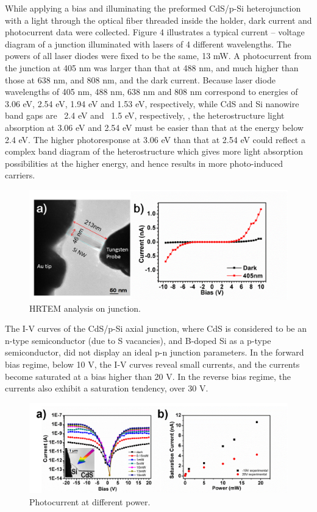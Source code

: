 While applying a bias and illuminating the preformed CdS/p-Si heterojunction with a light through the optical fiber threaded inside the holder, dark current and photocurrent data were collected. Figure 4 illustrates a typical current – voltage diagram of a junction illuminated with lasers of 4 different wavelengths. The powers of all laser diodes were fixed to be the same, 13 mW. A photocurrent from the junction at 405 nm was larger than that at 488 nm, and much higher than those at 638 nm, and 808 nm, and the dark current. Because laser diode wavelengths of 405 nm, 488 nm, 638 nm and 808 nm correspond to energies of 3.06 eV, 2.54 eV, 1.94 eV and 1.53 eV, respectively, while CdS and Si nanowire band gaps are ~2.4 eV and ~1.5 eV, respectively, \cite{Fabbri2014}, the heterostructure light absorption at 3.06 eV and 2.54 eV must be easier than that at the energy below 2.4 eV. The higher photoresponse at 3.06 eV than that at 2.54 eV could reflect a complex band diagram of the heterostructure which gives more light absorption possibilities at the higher energy, and hence results in more photo-induced carriers. 

\begin{figure}  
\includegraphics[width=\textwidth]{figures/figure3_s2}
\caption[HRTEM analysis on junction.]{HRTEM analysis on junction.
\label{fig:fig3_s2}}
\end{figure}

The I-V curves of the CdS/p-Si axial junction, where CdS is considered to be an n-type semiconductor (due to S vacancies), and B-doped Si as a p-type semiconductor, did not display an ideal p-n junction parameters. In the forward bias regime, below 10 V, the I-V curves reveal small currents, and the currents become saturated at a bias higher than 20 V. In the reverse bias regime, the currents also exhibit a saturation tendency, over 30 V. 

\begin{figure}  
\includegraphics[width=\textwidth]{figures/figure3_5}
\caption[Photocurrent at different power.]{Photocurrent at different power.
\label{fig:fig3_5}}
\end{figure}

